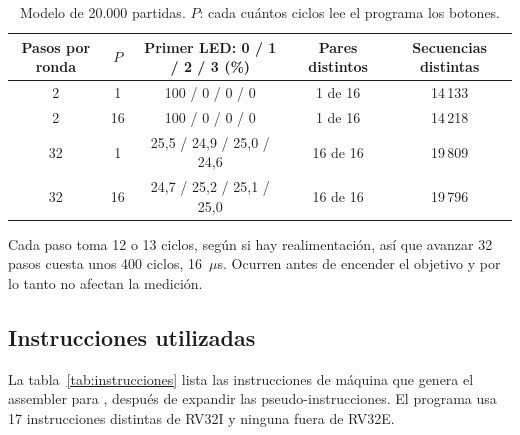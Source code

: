 \begin{table}[H]
\centering
\caption{Modelo de 20.000 partidas. $P$: cada cuántos ciclos lee el programa los botones.}
\label{tab:lfsr}
\begin{tabular}{ccccc}
\toprule
Pasos por ronda & $P$ & Primer LED: 0 / 1 / 2 / 3 (\%) & Pares distintos & Secuencias distintas \\
\midrule
2 & 1 & 100 / 0 / 0 / 0 & 1 de 16 & 14\,133 \\
2 & 16 & 100 / 0 / 0 / 0 & 1 de 16 & 14\,218 \\
32 & 1 & 25,5 / 24,9 / 25,0 / 24,6 & 16 de 16 & 19\,809 \\
32 & 16 & 24,7 / 25,2 / 25,1 / 25,0 & 16 de 16 & 19\,796 \\
\bottomrule
\end{tabular}
\end{table}

Cada paso toma 12 o 13 ciclos, según si hay realimentación, así que avanzar 32 pasos
cuesta unos 400 ciclos, 16~$\mu$s. Ocurren antes de encender el objetivo y por lo tanto
no afectan la medición.

\subsection{Instrucciones utilizadas}

La tabla~\ref{tab:instrucciones} lista las instrucciones de máquina que genera el
assembler para , después de expandir las pseudo-instrucciones. El programa
usa 17 instrucciones distintas de RV32I y ninguna fuera de RV32E.

